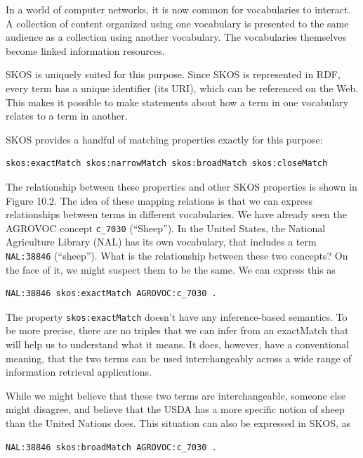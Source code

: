 In a world of computer networks, it is now common for vocabularies to
interact. A collection of content organized using one vocabulary is
presented to the same audience as a collection using another vocabulary.
The vocabularies themselves become linked information resources.

SKOS is uniquely suited for this purpose. Since SKOS is represented in
RDF, every term has a unique identifier (its URI), which can be
referenced on the Web. This makes it possible to make statements about
how a term in one vocabulary relates to a term in another.

SKOS provides a handful of matching properties exactly for this purpose:

\begin{lstlisting}
skos:exactMatch skos:narrowMatch skos:broadMatch skos:closeMatch
\end{lstlisting}

The relationship between these properties and other SKOS properties is
shown in Figure 10.2. The idea of these mapping relations is that we can
express relationships between terms in different
vocabularies. We have already seen the AGROVOC concept \texttt{c\_7030}
(``Sheep''). In the United States, the National Agriculture Library
(NAL) has its own vocabulary, that includes a term \texttt{NAL:38846}
(``sheep''). What is the relationship between these two concepts? On the
face of it, we might suspect them to be the same. We can express this as

\begin{lstlisting}
NAL:38846 skos:exactMatch AGROVOC:c_7030 .
\end{lstlisting}

The property \texttt{skos:exactMatch} doesn't have any inference-based semantics.
To be more precise, there are no triples that we can infer from an
exactMatch that will help us to understand what it means. It does,
however, have a conventional meaning, that the two terms can be used
interchangeably across a wide range of information retrieval
applications.

While we might believe that these two terms are interchangeable, someone
else might disagree, and believe that the USDA has a more specific
notion of sheep than the United Nations does. This situation can also be
expressed in SKOS, as

\begin{lstlisting}
NAL:38846 skos:broadMatch AGROVOC:c_7030 .
\end{lstlisting}

